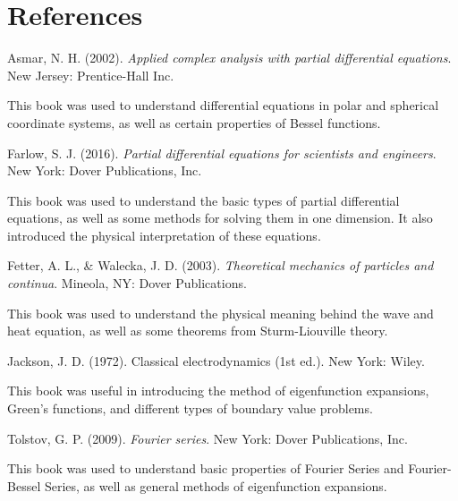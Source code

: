 \documentclass{article}
\begin{document}
\section{References}
Asmar, N. H. (2002). \textit{Applied complex analysis with partial differential equations}. New Jersey: Prentice-Hall Inc.\\
\begin{adjustwidth}{2 cm}{}
This book was used to understand differential equations in polar and spherical coordinate systems, as well as certain properties of Bessel functions.\\
\end{adjustwidth}
Farlow, S. J. (2016). \textit{Partial differential equations for scientists and engineers}. New York: Dover Publications, Inc.\\
\begin{adjustwidth}{2 cm}{}
This book was used to understand the basic types of partial differential equations, as well as some methods for solving them in one dimension. It also introduced the physical interpretation of these equations.\\
\end{adjustwidth}
Fetter, A. L., \& Walecka, J. D. (2003). \textit{Theoretical mechanics of particles and continua}. Mineola, NY: Dover Publications. \\
\begin{adjustwidth}{2 cm}{}
This book was used to understand the physical meaning behind the wave and heat equation, as well as some theorems from Sturm-Liouville theory.\\
\end{adjustwidth}
Jackson, J. D. (1972). Classical electrodynamics (1st ed.). New York: Wiley.\\
\begin{adjustwidth}{2 cm}{}
This book was useful in introducing the method of eigenfunction expansions, Green's functions, and different types of boundary value problems.\\
\end{adjustwidth}
Tolstov, G. P. (2009). \textit{Fourier series}. New York: Dover Publications, Inc.\\
\begin{adjustwidth}{2 cm}{}
This book was used to understand basic properties of Fourier Series and Fourier-Bessel Series, as well as general methods of eigenfunction expansions.
\end{adjustwidth}
\end{document}
